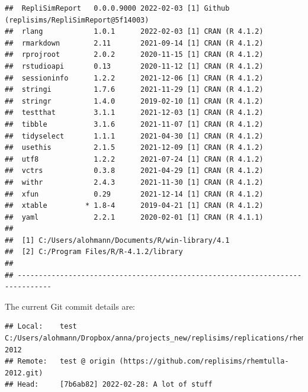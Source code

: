 \documentclass[10,a4paperpaper,]{article}
\begin{document}
\begin{verbatim}
##  RepliSimReport   0.0.0.9000 2022-02-03 [1] Github (replisims/RepliSimReport@5f14003)
##  rlang            1.0.1      2022-02-03 [1] CRAN (R 4.1.2)
##  rmarkdown        2.11       2021-09-14 [1] CRAN (R 4.1.2)
##  rprojroot        2.0.2      2020-11-15 [1] CRAN (R 4.1.2)
##  rstudioapi       0.13       2020-11-12 [1] CRAN (R 4.1.2)
##  sessioninfo      1.2.2      2021-12-06 [1] CRAN (R 4.1.2)
##  stringi          1.7.6      2021-11-29 [1] CRAN (R 4.1.2)
##  stringr          1.4.0      2019-02-10 [1] CRAN (R 4.1.2)
##  testthat         3.1.1      2021-12-03 [1] CRAN (R 4.1.2)
##  tibble           3.1.6      2021-11-07 [1] CRAN (R 4.1.2)
##  tidyselect       1.1.1      2021-04-30 [1] CRAN (R 4.1.2)
##  usethis          2.1.5      2021-12-09 [1] CRAN (R 4.1.2)
##  utf8             1.2.2      2021-07-24 [1] CRAN (R 4.1.2)
##  vctrs            0.3.8      2021-04-29 [1] CRAN (R 4.1.2)
##  withr            2.4.3      2021-11-30 [1] CRAN (R 4.1.2)
##  xfun             0.29       2021-12-14 [1] CRAN (R 4.1.2)
##  xtable         * 1.8-4      2019-04-21 [1] CRAN (R 4.1.2)
##  yaml             2.2.1      2020-02-01 [1] CRAN (R 4.1.1)
## 
##  [1] C:/Users/alohmann/Documents/R/win-library/4.1
##  [2] C:/Program Files/R/R-4.1.2/library
## 
## ------------------------------------------------------------------------------
\end{verbatim}

The current Git commit details are:

\begin{verbatim}
## Local:    test C:/Users/alohmann/Dropbox/anna/projects_new/replisims/replications/rhemtulla-2012
## Remote:   test @ origin (https://github.com/replisims/rhemtulla-2012.git)
## Head:     [7b6ab82] 2022-02-28: A lot of stuff
\end{verbatim}
\end{document}
